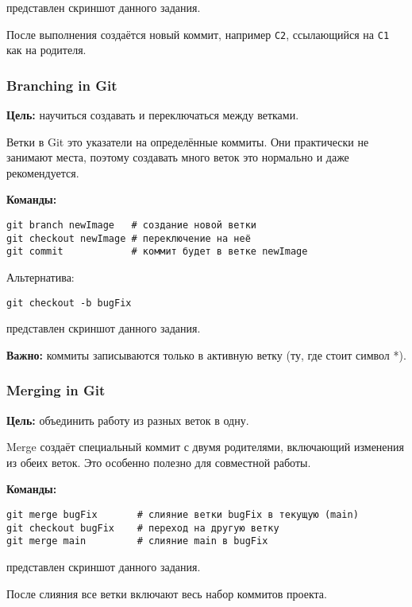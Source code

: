 \documentclass[a4paper,12pt]{report}
\begin{document}
 представлен скриншот данного задания.

После выполнения создаётся новый коммит, например \texttt{C2}, ссылающийся на \texttt{C1} как на родителя.

\subsubsection{Branching in Git}
\textbf{Цель:} научиться создавать и переключаться между ветками.

Ветки в Git \textendash{} это указатели на определённые коммиты. Они практически не занимают места, поэтому создавать много веток \textendash{} это нормально и даже рекомендуется.

\textbf{Команды:}
\begin{verbatim}
git branch newImage   # создание новой ветки
git checkout newImage # переключение на неё
git commit            # коммит будет в ветке newImage
\end{verbatim}

Альтернатива:
\begin{verbatim}
git checkout -b bugFix
\end{verbatim}

 представлен скриншот данного задания.

\textbf{Важно:} коммиты записываются только в активную ветку (ту, где стоит символ *).

\subsubsection{Merging in Git}
\textbf{Цель:} объединить работу из разных веток в одну.

Merge создаёт специальный коммит с двумя родителями, включающий изменения из обеих веток. Это особенно полезно для совместной работы.

\textbf{Команды:}
\begin{verbatim}
git merge bugFix       # слияние ветки bugFix в текущую (main)
git checkout bugFix    # переход на другую ветку
git merge main         # слияние main в bugFix
\end{verbatim}

 представлен скриншот данного задания.

После слияния все ветки включают весь набор коммитов проекта.
\end{document}
